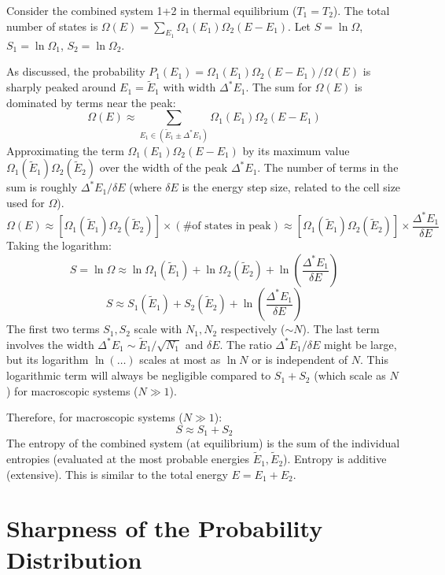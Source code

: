 \documentclass[11pt]{article}
\newcommand{\tE}{\tilde{E}} %
\begin{document}
Consider the combined system 1+2 in thermal equilibrium ($T_1=T_2$).
The total number of states is $\Omega(E) = \sum_{E_1} \Omega_1(E_1) \Omega_2(E-E_1)$.
Let $S = \ln \Omega$, $S_1 = \ln \Omega_1$, $S_2 = \ln \Omega_2$.

As discussed, the probability $P_1(E_1) = \Omega_1(E_1)\Omega_2(E-E_1)/\Omega(E)$ is sharply peaked around $E_1 = \tE_1$ with width $\Delta^* E_1$.
The sum for $\Omega(E)$ is dominated by terms near the peak:
\[ \Omega(E) \approx \sum_{E_1 \in (\tE_1 \pm \Delta^* E_1)} \Omega_1(E_1) \Omega_2(E-E_1) \]
Approximating the term $\Omega_1(E_1)\Omega_2(E-E_1)$ by its maximum value $\Omega_1(\tE_1)\Omega_2(\tE_2)$ over the width of the peak $\Delta^* E_1$. The number of terms in the sum is roughly $\Delta^* E_1 / \delta E$ (where $\delta E$ is the energy step size, related to the cell size used for $\Omega$).
\[ \Omega(E) \approx [\Omega_1(\tE_1) \Omega_2(\tE_2)] \times (\text{\# of states in peak}) \approx [\Omega_1(\tE_1) \Omega_2(\tE_2)] \times \frac{\Delta^* E_1}{\delta E} \]
Taking the logarithm:
\[ S = \ln \Omega \approx \ln \Omega_1(\tE_1) + \ln \Omega_2(\tE_2) + \ln\left(\frac{\Delta^* E_1}{\delta E}\right) \]
\[ S \approx S_1(\tE_1) + S_2(\tE_2) + \ln\left(\frac{\Delta^* E_1}{\delta E}\right) \]
The first two terms $S_1, S_2$ scale with $N_1, N_2$ respectively ($\sim N$).
The last term involves the width $\Delta^* E_1 \sim \tE_1/\sqrt{N_1}$ and $\delta E$. The ratio $\Delta^* E_1 / \delta E$ might be large, but its logarithm $\ln(\dots)$ scales at most as $\ln N$ or is independent of $N$.
This logarithmic term will always be negligible compared to $S_1+S_2$ (which scale as $N$) for macroscopic systems ($N \gg 1$).

Therefore, for macroscopic systems ($N \gg 1$):
\[ S \approx S_1 + S_2 \]
The entropy of the combined system (at equilibrium) is the sum of the individual entropies (evaluated at the most probable energies $\tE_1, \tE_2$). Entropy is additive (extensive). This is similar to the total energy $E=E_1+E_2$.

\section*{Sharpness of the Probability Distribution}
\end{document}
